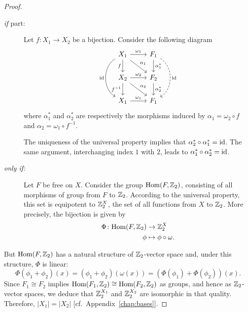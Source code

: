 \begin{proof}${}$
    \begin{description}
        \item[\rm{\it if\/} part:] Let $f\colon X_1\to X_2$ be a bijection. Consider the following diagram
        $$
            \begin{tikzcd}
                X_1
                        \arrow[r,"\omega_1"]
                        \arrow[d,"f"']
                        \arrow[rd,"\alpha_1"]
                        \arrow[dd,"\id"', bend right=60]
                    &F_1
                        \arrow[d,"\alpha_1^*"]
                        \arrow[dd,"\id",bend left=60,dashed]\\
                X_2
                        \arrow[r,"\omega_2"]
                        \arrow[d,"f^{-1}"']
                        \arrow[rd,"\alpha_2"]
                    &F_2
                        \arrow[d,"\alpha_2^*"]\\
                X_1
                        \arrow[r,"\omega_1"]
                    &F_1
            \end{tikzcd}
        $$
        where $\alpha_1^*$ and $\alpha_2^*$ are respectively the morphisms induced by $\alpha_1=\omega_2\circ f$ and $\alpha_2=\omega_1\circ f^{-1}$.

        The uniqueness of the universal property implies that $\alpha_2^*\circ\alpha_1^*=\operatorname{id}$. The same argument, interchanging index $1$ with $2$, leads to $\alpha_1^*\circ\alpha_2^*=\operatorname{id}$.

        \item[\it only if\rm:] Let $F$ be free on $X$. Consider the group ${\rm Hom}(F,\mathbb{Z}_2)$, consisting of all morphisms of group from $F$ to $\mathbb{Z}_2$. According to the universal property, this set is equipotent to $\mathbb{Z}_2^X$, the set of all functions from $X$ to $\mathbb{Z}_2$. More precisely, the bijection is given by
        \begin{align*}
            \Phi\colon{\rm Hom}(F,\mathbb{Z}_2)&\to\mathbb{Z}_2^X\\
            \phi&\mapsto\phi\circ\omega.
        \end{align*}
    \end{description}
    But ${\rm Hom}(F,\mathbb{Z}_2)$ has a natural structure of $\mathbb{Z}_2$-vector space and, under this structure, $\Phi$ is linear:
    $$
        \Phi(\phi_1+\phi_2)(x)=(\phi_1+\phi_2)(\omega(x))
            = (\Phi(\phi_1)+\Phi(\phi_2))(x).
    $$
    Since $F_1\cong F_2$ implies ${\rm Hom}(F_1,\mathbb{Z}_2)\cong{\rm Hom}(F_2,\mathbb{Z}_2)$ as groups, and hence as $\mathbb{Z}_2$-vector spaces, we deduce that $\mathbb{Z}_2^{X_1}$ and $\mathbb{Z}_2^{X_2}$ are isomorphic in that quality. Therefore, $|X_1|=|X_2|$ [cf.~Appendix~\ref{chap:bases}].
\end{proof}

